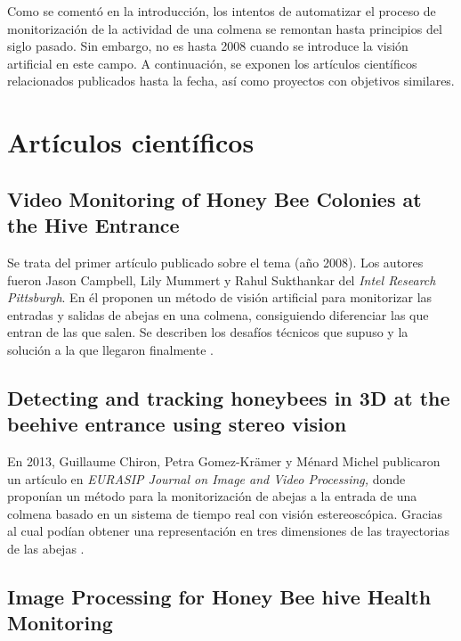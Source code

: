 
Como se comentó en la introducción, los intentos de automatizar el
proceso de monitorización de la actividad de una colmena se remontan
hasta principios del siglo pasado. Sin embargo, no es hasta 2008 cuando
se introduce la visión artificial en este campo. A continuación, se
exponen los artículos científicos relacionados publicados hasta la
fecha, así como proyectos con objetivos similares.

\section{Artículos científicos}\label{artuxedculos-cientuxedficos}

\subsection{Video Monitoring of Honey Bee Colonies at the Hive
Entrance}\label{video-monitoring-of-honey-bee-colonies-at-the-hive-entrance}

Se trata del primer artículo publicado sobre el tema (año 2008). Los
autores fueron Jason Campbell, Lily Mummert y Rahul Sukthankar del
\emph{Intel Research Pittsburgh}. En él proponen un método de visión
artificial para monitorizar las entradas y salidas de abejas en una
colmena, consiguiendo diferenciar las que entran de las que salen. Se
describen los desafíos técnicos que supuso y la solución a la que
llegaron finalmente \citep{art:campbell2008}.

\subsection{Detecting and tracking honeybees in 3D at the beehive
entrance using stereo
vision}\label{detecting-and-tracking-honeybees-in-3d-at-the-beehive-entrance-using-stereo-vision}

En 2013, Guillaume Chiron, Petra Gomez-Krämer y Ménard Michel publicaron
un artículo en \emph{EURASIP Journal on Image and Video Processing,}
donde proponían un método para la monitorización de abejas a la entrada
de una colmena basado en un sistema de tiempo real con visión
estereoscópica. Gracias al cual podían obtener una representación en
tres dimensiones de las trayectorias de las abejas
\citep{art:chiron2013}.

\subsection{Image Processing for Honey Bee hive Health
Monitoring}\label{image-processing-for-honey-bee-hive-health-monitoring}

